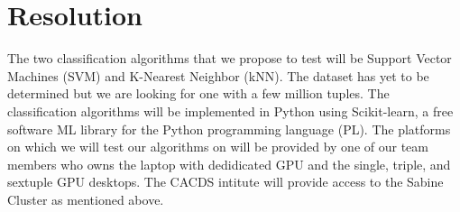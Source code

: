 \section*{Resolution}
\label{sec:Resolution}

The two classification algorithms that we propose to test will be 
Support Vector Machines (SVM) and K-Nearest Neighbor (kNN). The 
dataset has yet to be determined but we are looking for one with a 
few million tuples. The classification algorithms will be implemented 
in Python using Scikit-learn, a free software ML library for the Python 
programming language (PL). The platforms on which we will test our 
algorithms on will be provided by one of our team members who owns the 
laptop with dedidicated GPU and the single, triple, and sextuple GPU 
desktops. The CACDS intitute will provide access to the Sabine Cluster 
as mentioned above. 
